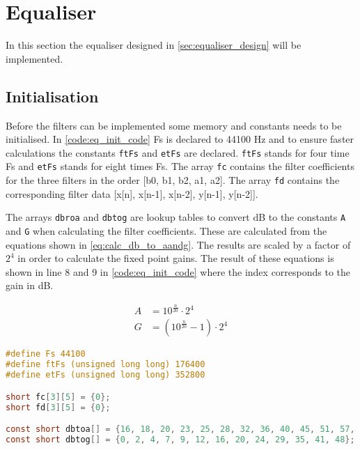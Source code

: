 \section{Equaliser}
\label{sec:equaliser_imp}
In this section the equaliser designed in \autoref{sec:equaliser_design} will be implemented.

\subsection{Initialisation}
Before the filters can be implemented some memory and constants needs to be initialised. In \autoref{code:eq_init_code} Fs is declared to 44100 Hz and to ensure faster calculations the constants \texttt{ftFs} and \texttt{etFs} are declared. \texttt{ftFs} stands for four time Fs and \texttt{etFs} stands for eight times Fs. The array \texttt{fc} contains the filter coefficients for the three filters in the order [b0, b1, b2, a1, a2]. The array \texttt{fd} contains the corresponding filter data [x[n], x[n-1], x[n-2], y[n-1], y[n-2]].

The arrays \texttt{dbroa} and \texttt{dbtog} are lookup tables to convert dB to the constants \texttt{A} and \texttt{G} when calculating the filter coefficients. These are calculated from the equations shown in \autoref{eq:calc_db_to_aandg}. The results are scaled by a factor of $2^4$ in order to calculate the fixed point gains. The result of these equations is shown in line 8 and 9 in \autoref{code:eq_init_code} where the index corresponds to the gain in dB.

\begin{equation}\label{eq:calc_db_to_aandg}
\begin{split}
A &= 10^{\frac{n}{20}}\cdot 2 ^{4}\\
G &= (10^{\frac{n}{20}} -1 )\cdot 2^{4}
\end{split}
\end{equation}

\startexplain
\stopexplain


\begin{lstlisting}[caption={Initialisation of constants and memory for the equaliser.},language=C,label={code:eq_init_code},tabsize=2]
#define Fs 44100
#define ftFs (unsigned long long) 176400
#define etFs (unsigned long long) 352800

short fc[3][5] = {0};
short fd[3][5] = {0};

const short dbtoa[] = {16, 18, 20, 23, 25, 28, 32, 36, 40, 45, 51, 57, 64};
const short dbtog[] = {0, 2, 4, 7, 9, 12, 16, 20, 24, 29, 35, 41, 48};
\end{lstlisting}

